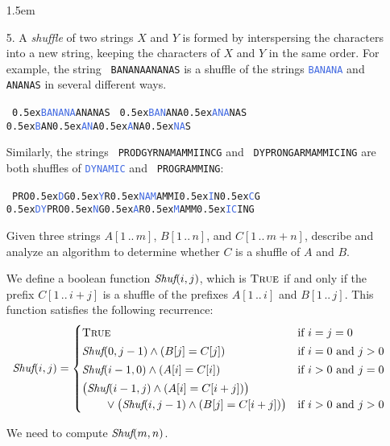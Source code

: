 \documentclass[11pt]{article}
\def\Sym#1{\texttt{\upshape\textcolor{BrickRed}{#1}}}
\def\SymBlue#1{\texttt{\upshape\textcolor{RoyalBlue}{#1}}}
\def\u#1{\raise0.5ex\hbox{\textcolor{RoyalBlue}{#1}}}
\def\Sym#1{\texttt{\upshape \color{BrickRed} {#1}}}
\begin{document}
\begin{enumerate}\parindent 1.5em
\item[5.]
A \emph{shuffle} of two strings $X$ and $Y$ is formed by interspersing the characters into a new string, keeping the characters of $X$ and $Y$ in the same order. For example, the string \Sym{BANANAANANAS} is a shuffle of the strings \SymBlue{BANANA} and \Sym{ANANAS} in several different ways.
\begin{center}
	\Sym{\u{BANANA}ANANAS}
	\qquad
	\Sym{\u{BAN}ANA\u{ANA}NAS}
	\qquad
	\Sym{\u{B}AN\u{AN}A\u{A}NA\u{NA}S}
\end{center}
Similarly, the strings \Sym{PRODGYRNAMAMMIINCG} and \Sym{DYPRONGARMAMMICING} are both shuffles of \SymBlue{DYNAMIC} and \Sym{PROGRAMMING}:
\begin{center}
	\Sym{PRO\u{D}G\u{Y}R\u{NAM}AMMI\u{I}N\u{C}G}
	\qquad
	\qquad
	\Sym{\u{DY}PRO\u{N}G\u{A}R\u{M}AMM\u{IC}ING}
\end{center}
Given three strings $A[1\,..\,m]$, $B[1\,..\,n]$, and $C[1\,..\,m+n]$, describe and analyze an algorithm to determine whether $C$ is a shuffle of $A$ and $B$.

\begin{solution}
We define a boolean function $\emph{Shuf}(i,j)$, which is $\textsc{True}$ if and only if the prefix $C[1\,..\,i+j]$ is a shuffle of the prefixes $A[1\,..\,i]$ and $B[1\,..\,j]$.  This function satisfies the following recurrence:
\[
	\emph{Shuf}(i,j) =
	\begin{cases}
		\textsc{True} & \text{if $i=j=0$}
\\[0.5ex]
		\emph{Shuf}(0,j-1) \strut\land (B[j]=C[j]) & \text{if $i=0$ and $j>0$}
\\[0.5ex]
		\emph{Shuf}(i-1,0) \strut\land (A[i]=C[i]) & \text{if $i>0$ and $j=0$}
\\[0.5ex]
		\left(\emph{Shuf}(i-1,j) \strut\land (A[i]=C[i+j])\right)
\\
			\qquad {}\lor \left(\emph{Shuf}(i,j-1) \strut\land (B[j]=C[i+j])\right)
			& \text{if $i>0$ and $j>0$}
	\end{cases}
\]

We need to compute $\emph{Shuf}(m,n)$.


\end{solution}
\end{enumerate}
\end{document}
